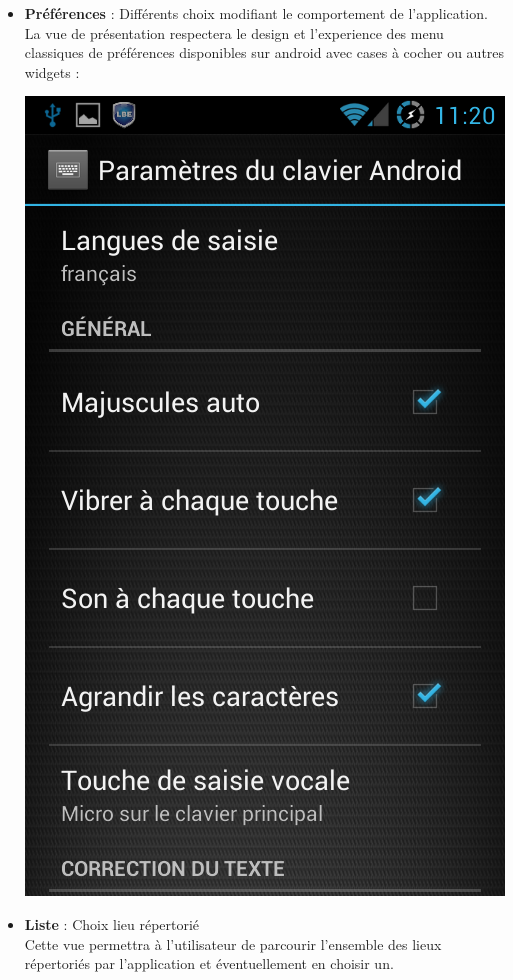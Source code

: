 \documentclass{article}
\begin{document}
\begin{itemize}
\begin{center}
		\end{center}
	\item \textbf{Préférences} : Différents choix modifiant le comportement de l'application. \\
	La vue de présentation respectera le design et l'experience des menu classiques de préférences disponibles sur android avec cases à cocher ou autres widgets :
		\begin{center}
			\includegraphics[scale=0.35]{preferences.png}
		\end{center}
	\item \textbf{Liste} : Choix lieu répertorié \\
	Cette vue permettra à l'utilisateur de parcourir l'ensemble des lieux répertoriés par l'application et éventuellement en choisir un.
	\end{itemize}
	
\end{document}
